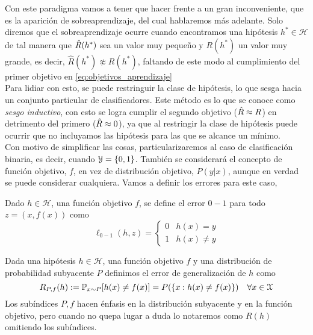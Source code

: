         Con este paradigma vamos a tener que hacer frente a un gran inconveniente, que es la aparición de sobreaprendizaje, del cual hablaremos más adelante. Solo diremos que el sobreaprendizaje ocurre cuando encontramos una hipótesis $h^* \in \mathcal{H}$ de tal manera que $\Hat{R}(h^*)$ sea un valor muy pequeño y $R(h^*)$ un valor muy grande, es decir, $\hat{R}(h^*) \not\approx R(h^*)$, faltando de este modo al cumplimiento del primer objetivo en \eqref{eq:objetivos_aprendizaje} \\
        
        Para lidiar con esto, se puede restringuir la clase de hipótesis, lo que sesga hacia un conjunto particular de clasificadores. Este método es lo que se conoce como \textit{sesgo inductivo}, con esto se logra cumplir el segundo objetivo ($\hat{R} \approx R$) en detrimento del primero ($\hat{R} \approx 0$), ya que al restringir la clase de hipótesis puede ocurrir que no incluyamos las hipótesis para las que se alcance un mínimo. \\
        
        
        
        Con motivo de simplificar las cosas, particularizaremos al caso de clasificación binaria, es decir, cuando $\mathcal{Y} = \{0,1\}$. También se considerará el concepto de función objetivo, $f$, en vez de distribución objetivo, $P(y|x)$, aunque en verdad se puede considerar cualquiera. Vamos a definir los errores para este caso,

    
            \begin{definicion}[Error 0-1]
            Dado $h \in \mathcal{H}$, una función objetivo $f$, se define el error $0-1$ para todo ${z = (x,f(x))}$ como
            \begin{equation}
                \ell_{0-1}(h,z) = 
                \left\{
                \begin{array}{cc}
                     0 & h(x) = y \\
                     1 & h(x) \neq y
                \end{array}
                \right.
             \end{equation}
            \end{definicion}
        
        
            \begin{definicion}\label{def:errorGeneralizacion}
            Dada una hipótesis $h \in \mathcal{H}$, una función objetivo $f$ y una distribución de probabilidad subyacente $P$ definimos el error de generalización de $h$ como
            \begin{equation}
                R_{P,f}(h) := \mathbb{P}_{x \sim P}[h(x) \neq f(x)] = P(\{x: h(x) \neq f(x)\}) \quad \forall x \in \mathcal{X}
            \end{equation}
            \noindent Los subíndices $P,f$ hacen énfasis en la distribución subyacente y en la función objetivo, pero cuando no quepa lugar a duda lo notaremos como $R(h)$ omitiendo los subíndices. \\
            \end{definicion}
        
